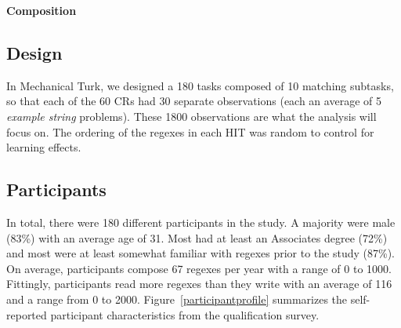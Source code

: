 \textbf{Composition}



\subsection{Design}
In Mechanical Turk, we designed a 180 tasks composed of 10 matching subtasks, so that each of the 60 CRs had 30 separate observations (each an average of 5 \emph{example string} problems).  These 1800 observations are what the analysis will focus on. The ordering of the regexes in each HIT was random to control for learning effects. 



\subsection{Participants}
In total, there were 180 different participants in the study. A majority were male (83\%) with an average age of 31. Most had
at least an Associates degree (72\%) and most were at least somewhat familiar with regexes prior to the study (87\%). On average, 
participants compose 67 regexes per year with a range of 0 to 1000. Fittingly, participants read more regexes than they write with an average of 116 and a range from 0 to 2000. Figure~\ref{participantprofile} summarizes the self-reported participant characteristics from the qualification survey. 


